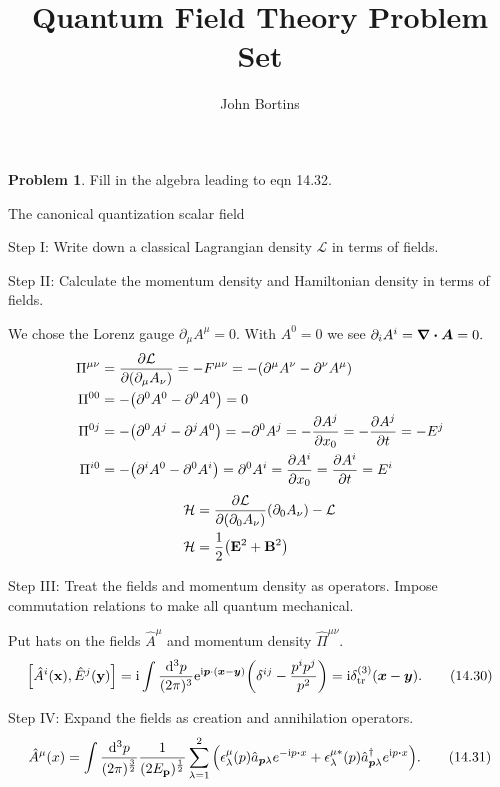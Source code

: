\documentclass[letterpaper]{article}
\title{Quantum Field Theory Problem Set}
\author{John Bortins}
\theoremstyle{definition}
\newtheorem{prob}{Problem}[section]
\newcommand{\intp}{\int \frac{\dd[3]{p}}{(2\pi)^\frac{3}{2}}  \frac{1}{(2E_{\vb{p}})^{\frac{1}{2}}}}
\begin{document}
\maketitle{}


\begin{prob}
  Fill in the algebra leading to eqn 14.32.
\end{prob}
The canonical quantization scalar field

Step I: Write down a classical Lagrangian density $\mathcal{L}$ in terms of fields.

Step II: Calculate the momentum density and Hamiltonian density in terms of fields.

We chose the Lorenz gauge \(\partial_\mu A^\mu=0.\) With \(A^0=0\) we see \(\partial_i A^i=\div \vb*{A}=0.\)
\begin{align*}
  \Pi^{\mu\nu} & =\pdv{\mathcal{L}}{(\partial_\mu A_\nu)}=-F^{\mu\nu}=-\pqty{\partial^\mu A^\nu-\partial^\nu A^\mu} \\
  \Pi^{00}     & =-\pqty{\partial^0 A^0-\partial^0 A^0}=0                                                           \\
  \Pi^{0j}     & =-\pqty{\partial^0 A^j-\partial^j A^0}=-\partial^0 A^j=-\pdv{A^j}{x_0}=-\pdv{A^j}{t}=-E^j          \\
  \Pi^{i0}     & =-\pqty{\partial^i A^0-\partial^0 A^i}= \partial^0 A^i=\pdv{A^i}{x_0}=\pdv{A^i}{t}=E^i             \\
\end{align*}
\begin{align*}
  \mathcal{H} & ={\pdv{\mathcal{L}}{(\partial_0 A_\nu)}}   (\partial_0 A_\nu)-\mathcal{L} \\
  \mathcal{H} & =\frac{1}{2}\pqty{\vb{E}^2+\vb{B}^2}                                      \\
\end{align*}

Step III: Treat the fields and momentum density as operators. Impose commutation relations to make all quantum mechanical.

Put hats on the fields \(\hat{A}^\mu\) and momentum density \(\hat{\Pi}^{\mu\nu}\).\[\comm{\hat{A}^i(\vb{x})}{\hat{E}^j(\vb{y})}=\text{i}\int\frac{\dd[3]{p}}{(2\pi)^3}\text{e}^{\text{i}\vb*{p}\cdot(\vb*{x}-\vb*{y})}\pqty{\delta^{ij}-\frac{p^i p^j}{p^2}}=\text{i}\delta^{(3)}_{\text{tr}}(\vb*{x}-\vb*{y}).\qquad(14.30)\]

Step IV: Expand the fields as creation and annihilation operators.\[\hat{A}^\mu(x)=\intp\sum^2_{\lambda=1}\pqty{\epsilon^\mu_\lambda(p)\hat{a}_{\vb*{p}\lambda}e^{-\text{i}p\vdot x}+\epsilon^{\mu*}_\lambda(p)\hat{a}^\dagger_{\vb*{p}\lambda}e^{\text{i}p\vdot x}}.\qquad(14.31)\]
\end{document}
